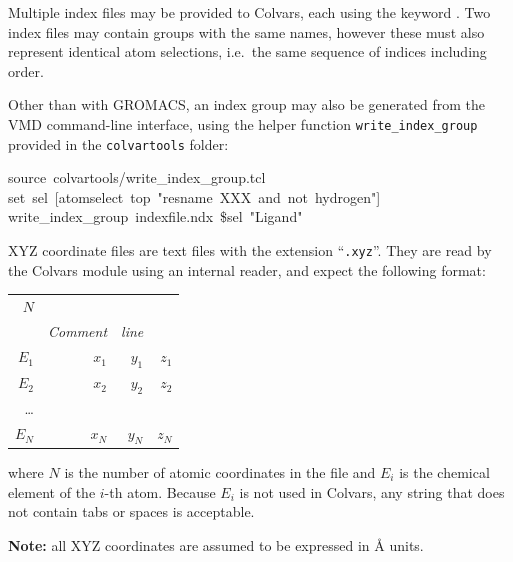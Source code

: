 Multiple index files may be provided to Colvars, each using the keyword .  Two index files may contain groups with the same names, however these must also represent identical atom selections, i.e.\ the same sequence of indices including order.


Other than with GROMACS, an index group may also be generated from the VMD command-line interface, using the helper function \texttt{write\_index\_group} provided in the \texttt{colvartools} folder:
\begin{mdexampleinput}
\-source~colvartools/write\_index\_group.tcl\\
\-set~sel~[atomselect~top~"resname~XXX~and~not~hydrogen"]\\
\-write\_index\_group~indexfile.ndx~\${sel}~"Ligand"
\end{mdexampleinput}


XYZ coordinate files are text files with the extension ``\texttt{.xyz}''. They are read by the Colvars module using an internal reader, and expect the following format:

\noindent\begin{tabular}{r r r r}
$N$\\
& \emph{Comment} & \emph{line} & \\
$E_{1}$ & $x_{1}$ & $y_{1}$ & $z_{1}$\\
$E_{2} $ & $x_{2}$ & $y_{2}$ & $z_{2}$\\
\ldots\\
$E_{N}$ & $x_{N}$ & $y_{N}$ & $z_{N}$ \\
\end{tabular}

\noindent{}where $N$ is the number of atomic coordinates in the file and $E_i$ is the chemical element of the $i$-th atom.
Because $E_i$ is not used in Colvars, any string that does not contain tabs or spaces is acceptable.

\textbf{Note:} all XYZ coordinates are assumed to be expressed in \AA{} units.

